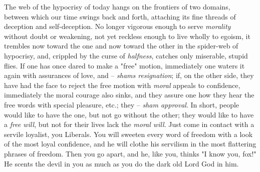 \documentclass[a4paper]{book}
\begin{document}
The web of the hypocrisy of today hangs on the frontiers of two domains, 
between which our time swings back and forth, attaching its fine threads of 
deception and self-deception. No longer vigorous enough to serve 
\textit{morality} without doubt or weakening, not yet reckless enough to live 
wholly to egoism, it trembles now toward the one and now toward the other in 
the spider-web of hypocrisy, and, crippled by the curse of \textit{halfness}, 
catches only miserable, stupid flies. If one has once dared to make a 
"{}free"{} motion, immediately one waters it again with assurances of love, 
and -- \textit{shams resignation}; if, on the other side, they have had the 
face to reject the free motion with \textit{moral} appeals to confidence, 
immediately the moral courage also sinks, and they assure one how they hear 
the free words with special pleasure, etc.; they -- \textit{sham approval}. In 
short, people would like to have the one, but not go without the other; they 
would like to have a \textit{free will}, but not for their lives lack the 
\textit{moral will}. Just come in contact with a servile loyalist, you 
Liberals. You will sweeten every word of freedom with a look of the most loyal 
confidence, and he will clothe his servilism in the most flattering phrases of 
freedom. Then you go apart, and he, like you, thinks "{}I know you, fox!"{} He 
scents the devil in you as much as you do the dark old Lord God in him.
\end{document}
